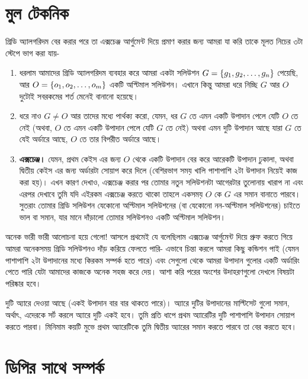\section{মুল টেকনিক}

গ্রিডি অ্যালগরিদম বের করার পরে তা এক্সচেঞ্জ আর্গুমেন্ট দিয়ে প্রমাণ করার জন্য আমরা যা করি তাকে মূলত নিচের ৩টা স্টেপে ভাগ করা যায়-
\begin{enumerate}
	\item ধরলাম আমাদের গ্রিডি অ্যালগরিদম ব্যবহার করে আমরা একটা সলিউশন $G = \left \{ g_1, g_2, \ldots, g_n \right \}$ পেয়েছি, আর $O = \left \{ o_1, o_2, \ldots, o_m \right \}$ একটি অপ্টিমাল সলিউশন।  এখানে কিন্তু আমরা ধরে নিচ্ছি $G$ আর $O$ দুটোই সবরকমের শর্ত মেনেই বানানো হয়েছে।
	\item ধরে নাও $G \not= O$ আর  তাদের মধ্যে পার্থক্য করো, যেমন, ধর $G$ তে এমন একটি উপাদান পেলে যেটি $O$ তে নেই (অথবা, $O$ তে এমন একটি উপাদান পেলে যেটি $G$ তে নেই) অথবা এমন দুটি উপাদান আছে যারা $G$ তে যেই অর্ডারে আছে, $O$ তে তার বিপরীত অর্ডারে আছে।
	\item \textbf{এক্সচেঞ্জ।} যেমন, প্রথম কেইস এর জন্য $O$ থেকে একটি উপাদান বের করে আরেকটি উপাদান ঢুকালা, অথবা দ্বিতীয় কেইস এর জন্য অর্ডারটা সোয়াপ করে দিলে (বেশিরভাগ সময় খালি পাশাপাশি ২টা উপাদান নিয়েই কাজ করা হয়)। এখন কারণ দেখাও, এক্সচেঞ্জ করার পর তোমার নতুন সলিউশনটা আগেরটার তুলোনায় খারাপ না এবং এরপর দেখাবে তুমি যদি এইরকম এক্সচেঞ্জ করতে থাকো তাহলে একসময় $O$ কে $G$ এর সমান বানাতে পারবে। সুতরাং তোমার গ্রিডি সলিউশন যেকোনো অপ্টিমাল সলিউশনের (বা যেকোনো নন-অপ্টিমাল সলিউশনের) চাইতে ভাল বা সমান, যার মানে দাঁড়ালো তোমার সলিউশনও একটি অপ্টিমাল সলিউশন।
\end{enumerate}

অনেক ভারী ভারী আলোচনা হয়ে গেলো! আসলে প্রথমেই যে বলেছিলাম এক্সচেঞ্জ আর্গুমেন্ট দিয়ে প্রুফ করতে গিয়ে আমরা অনেকসময় গ্রিডি সলিউশনও দাঁড় করিয়ে ফেলতে পারি- এভাবে চিন্তা করলে আমরা কিছু কন্ডিশন পাই (যেমন পাশাপাশি ২টা উপাদানের মধ্যে কিরকম সম্পর্ক হতে পারে) এবং সেগুলো থেকে আমরা উপাদান গুলোর একটি অর্ডারিং পেতে পারি যেটা আমাদের কাজকে অনেক সহজ করে দেয়। আশা করি পরের অংশের উদাহরণগুলো দেখলে বিষয়টা পরিষ্কার হবে।

\begin{diybox}
	দুটি অ্যারে দেওয়া আছে (একই উপাদান বার বার থাকতে পারে)। অ্যারে দুটির উপাদানের মাল্টিসেট গুলো সমান, অর্থাৎ, এদেরকে সর্ট করলে অ্যারে দুটি একই হবে। তুমি প্রতি ধাপে প্রথম অ্যারেটির দুটি পাশাপাশি উপাদান সোয়াপ করতে পারবা। মিনিমাম কয়টি মুভে প্রথম অ্যারেটিকে তুমি দ্বিতীয় অ্যারের সমান করতে পারবে তা বের করতে হবে।
\end{diybox}


\section{ডিপির সাথে সম্পর্ক}

